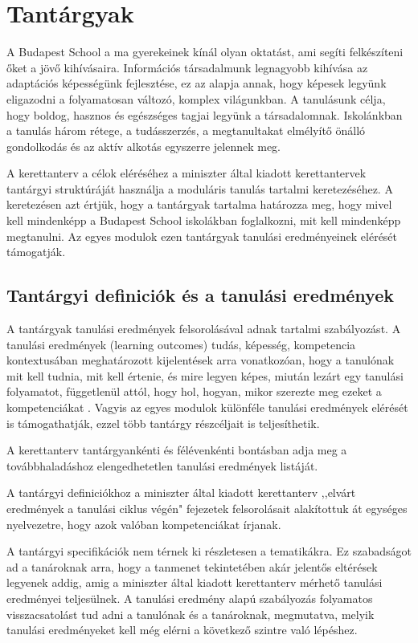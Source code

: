 \section{Tantárgyak}
\label{sec:tantargyak}
A Budapest School a ma gyerekeinek kínál olyan oktatást, ami segíti felkészíteni őket a jövő kihívásaira. Információs társadalmunk legnagyobb kihívása az adaptációs képességünk fejlesztése, ez az alapja annak, hogy képesek legyünk eligazodni a folyamatosan változó, komplex világunkban. A tanulásunk célja, hogy boldog, hasznos és egészséges tagjai legyünk a társadalomnak. Iskolánkban a tanulás három rétege, a tudásszerzés, a megtanultakat elmélyítő önálló gondolkodás és az aktív alkotás egyszerre jelennek meg.

A kerettanterv a célok eléréséhez a miniszter által kiadott kerettantervek tantárgyi struktúráját használja  a moduláris tanulás tartalmi keretezéséhez. A keretezésen azt értjük, hogy a tantárgyak tartalma határozza meg, hogy mivel kell mindenképp a Budapest School iskolákban foglalkozni, mit kell mindenképp megtanulni. 
Az egyes modulok ezen tantárgyak tanulási eredményeinek elérését támogatják.




\subsection{Tantárgyi definiciók és a tanulási eredmények}
A tantárgyak tanulási eredmények felsorolásával adnak tartalmi szabályozást. A tanulási eredmények (learning outcomes) tudás, képesség, kompetencia kontextusában meghatározott kijelentések arra vonatkozóan, hogy a tanulónak mit kell tudnia, mit kell értenie, és mire legyen képes, miután lezárt egy tanulási folyamatot, függetlenül attól, hogy hol, hogyan, mikor szerezte meg ezeket a kompetenciákat \citep{learning_outcomes}.  Vagyis  az egyes modulok különféle tanulási eredmények elérését is támogathatják, ezzel több tantárgy részcéljait is teljesíthetik.

A kerettanterv tantárgyankénti és félévenkénti bontásban adja meg a továbbhaladáshoz elengedhetetlen tanulási eredmények listáját.

A tantárgyi definiciókhoz a miniszter által kiadott kerettanterv ,,elvárt eredmények a tanulási ciklus végén" fejezetek felsorolásait alakítottuk át egységes nyelvezetre, hogy azok valóban kompetenciákat írjanak.

A tantárgyi specifikációk nem térnek ki rész\-letesen a tematikákra. Ez szabadságot ad a tanároknak arra, hogy a tanmenet tekintetében akár jelentős eltérések legyenek addig, amig a miniszter által kiadott kerettanterv mérhető tanulási eredményei teljesülnek. A tanulási eredmény alapú szabályozás folyamatos visszacsatolást tud adni a tanulónak és a tanároknak, megmutatva, melyik tanulási eredményeket kell még elérni a következő szintre való lépéshez.

